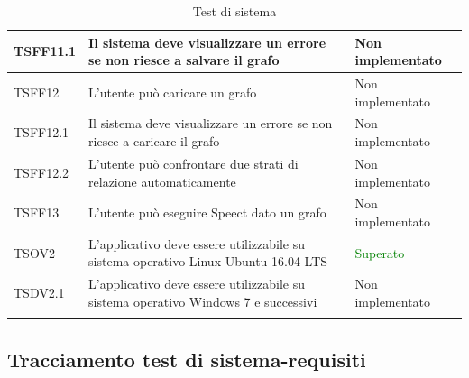\documentclass[openany,12pt,a4paper]{report}
\begin{document}
\begin{longtable}{| p{2cm} |p{8cm} | p{2.5cm} |}
	
	\newline TSFF11.1&
	\newline Il sistema deve visualizzare un errore se non riesce a salvare il grafo&
	\newline Non implementato 
	\\[1em]
	\hline
	
	\newline TSFF12&
	\newline L'utente può caricare un grafo&
	\newline Non implementato
	\\[1em]
	\hline
	
	\newline TSFF12.1&
	\newline Il sistema deve visualizzare un errore se non riesce a caricare il grafo&
	\newline Non implementato
	\\[1em]
	\hline
	
	\newline TSFF12.2&
	\newline L'utente può confrontare due strati di relazione automaticamente&
	\newline Non implementato
	\\[1em]
	\hline
	
	
	\newline TSFF13&
	\newline L'utente può eseguire Speect dato un grafo&
	\newline Non implementato
	\\[1em]
	\hline
	
	\newline TSOV2&
	\newline 
	L'applicativo deve essere utilizzabile su sistema operativo Linux Ubuntu 16.04 LTS&
	\newline \textcolor{green}{Superato}
	\\[1em]
	\hline
	\newline TSDV2.1&
	\newline 
	L'applicativo deve essere utilizzabile su sistema operativo Windows 7 e successivi&
	\newline Non implementato
	\\[1em]
	\hline
\caption{Test di sistema}
\end{longtable}

\subsection{Tracciamento test di sistema-requisiti}
\end{document}
